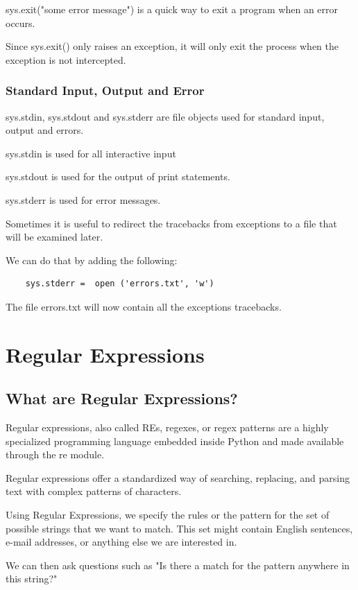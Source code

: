 \documentclass{article}
\begin{document}
 sys.exit("some error message") is a quick way to exit a program when an error occurs.

Since sys.exit()  only raises an exception, it will only exit the process when the exception is not intercepted.

\subsubsection{Standard Input, Output and Error}

sys.stdin, sys.stdout and sys.stderr  are file objects used for standard input, output and errors.

sys.stdin is used for all interactive input

sys.stdout is used for the output of print statements.

sys.stderr is used for error messages.

Sometimes it is useful to redirect the tracebacks from exceptions to a file that will be examined later.

We can do that by adding the following:

\begin{lstlisting}
    sys.stderr =  open ('errors.txt', 'w')
\end{lstlisting}

The file errors.txt will now contain all the exceptions tracebacks.

\section{Regular Expressions}
\subsection{What are Regular Expressions?}

Regular expressions, also called REs, regexes, or regex patterns are a highly specialized programming language embedded inside Python and made available through the re module.

Regular expressions offer a standardized way of searching, replacing, and parsing text with complex patterns of characters. 

Using Regular Expressions, we specify the rules or the pattern for the set of possible strings that we want to match.  This set might contain English sentences, e-mail addresses, or anything else we are interested in. 

We can then ask questions such as "Is there a match for the pattern anywhere in this string?"
\end{document}
